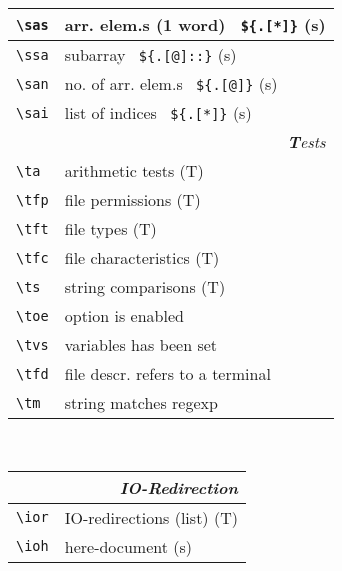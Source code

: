 \documentclass[oneside,11pt,landscape,DIV16]{scrartcl}
\begin{document}
\begin{multicols}{3}
\begin{center}
\begin{tabular}[]{|p{11mm}|p{60mm}|}
\hline \verb'\sas' & arr. elem.s (1 word) \ \verb'${.[*]}' \hfill (s)\\
\hline \verb'\ssa' & subarray \ \verb'${.[@]::}'           \hfill (s)\\
\hline \verb'\san' & no. of arr. elem.s \ \verb'${.[@]}'   \hfill (s)\\
\hline \verb'\sai' & list of indices \ \verb'${.[*]}'      \hfill (s)\\
\hline
\hline
\multicolumn{2}{|r|}{\textsl{\textbf{T}ests}}                 \\[1.0ex]
\hline \verb'\ta'  & arithmetic tests                  \hfill (T)\\
\hline \verb'\tfp' & file permissions                  \hfill (T)\\
\hline \verb'\tft' & file types                        \hfill (T)\\
\hline \verb'\tfc' & file characteristics              \hfill (T)\\
\hline \verb'\ts'  & string comparisons                \hfill (T)\\
\hline \verb'\toe' & option is enabled                 \\
\hline \verb'\tvs' & variables has been set            \\
\hline \verb'\tfd' & file descr.  refers to a terminal \\
\hline \verb'\tm'  & string matches regexp             \\
\hline
\end{tabular}\\
%
\begin{tabular}[]{|p{11mm}|p{60mm}|}
\hline
\multicolumn{2}{|r|}{\textsl{\textbf{I}O-Redirection}}                 \\[1.0ex]
\hline \verb'\ior'   & IO-redirections (list)           \hfill (T)\\
\hline \verb'\ioh'   & here-document                    \hfill (s)\\

\end{tabular}
\end{center}
\end{multicols}
\end{document}
